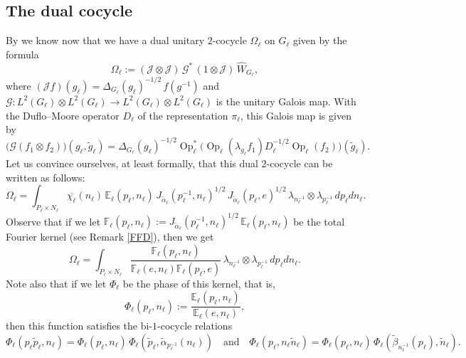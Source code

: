 \documentclass[a4paper,11pt,reqno]{amsart}
\numberwithin{equation}{section}
\theoremstyle{remark}
\theoremstyle{definition}
\newcommand\Op{\operatorname{Op}}
\newcommand{\G}{{\mathcal G}}
\newcommand{\CJ}{\mathcal J}
\newcommand{\E}{\mathbb E}
\begin{document}
\subsection{The dual cocycle}
By \cite{BGNT3} we know now that we have a dual unitary $2$-cocycle $\Omega_\ell$ on $G_\ell$ given by the formula
$$
\Omega_\ell:= (\CJ\otimes\CJ)\,\G^*\,  (1\otimes\CJ)\, \hat W_{G_\ell},
$$
 where $(\CJ f)(g_\ell)=\Delta_{G_\ell}(g_\ell)^{-1/2}\,f(g^{-1})$ and
  $\G\colon L^2(G_\ell)\otimes L^2(G_\ell)\to L^2(G_\ell)\otimes L^2(G_\ell)$ is the unitary Galois map. With  the Duflo--Moore operator $D_\ell$ of the representation
  $\pi_\ell$, this Galois map is given  by
$$
\big(\G(f_1\otimes f_2)\big)(g_\ell,\tilde g_\ell)=\Delta_{G_\ell}(g_\ell)^{-1/2}\Op_\ell^*\big(\Op_\ell(\lambda_{g_\ell}f_1)D_\ell^{-1/2}\Op_\ell(f_2)\big)(\tilde g_\ell).
$$
Let us convince ourselves, at least formally, that this dual $2$-cocycle can be written as follows:
\begin{equation}
\label{FF}
\Omega_\ell=\int_{P_\ell\times N_\ell}
\overline{\chi_\ell}(n_\ell)\,\E_\ell(p_\ell,n_\ell)\, J_{\tilde\alpha_\ell}( p_\ell^{-1},n_\ell)^{1/2}\,J_{\tilde\alpha_\ell}( p_\ell,e)^{1/2}
\,\lambda_{n_\ell^{-1}}\otimes \lambda_{p_\ell^{-1}}\, dp_\ell dn_\ell.
\end{equation}
Observe that if we let $\mathbb F_\ell(p_\ell,n_\ell):=J_{\tilde\alpha_\ell}( p_\ell^{-1},n_\ell)^{1/2}\,\E_\ell(p_\ell,n_\ell)$ be the total Fourier kernel
(see Remark \ref{FFD}), then we get
$$
\Omega_\ell=\int_{P_\ell\times N_\ell} \frac{\mathbb F_\ell(p_\ell,n_\ell)}{\mathbb F_\ell(e,n_\ell)\mathbb F_\ell(p_\ell,e)}\,\lambda_{n_\ell^{-1}}\otimes \lambda_{p_\ell^{-1}}\, dp_\ell dn_\ell.
$$
Note also that if we let $\Phi_\ell$ be the phase of this kernel, that is,
$$
\Phi_\ell(p_\ell,n_\ell):=\frac{\mathbb E_\ell(p_\ell,n_\ell)}{\mathbb E_\ell(e,n_\ell)},
$$
then this function satisfies the bi-$1$-cocycle   relations
\begin{equation*}
\Phi_\ell(p_\ell\tilde p_\ell,n_\ell)=\Phi_\ell(p_\ell,n_\ell)\,\Phi_\ell(\tilde p_\ell,\tilde\alpha_{p_\ell^{-1}}(n_\ell))\quad\mbox{and}\quad
\Phi_\ell(p_\ell, n_\ell\tilde n_\ell)=\Phi_\ell(p_\ell,n_\ell)\,\Phi_\ell(\tilde\beta_{n_\ell^{-1}}(p_\ell),\tilde n_\ell).
\end{equation*}
\end{document}
